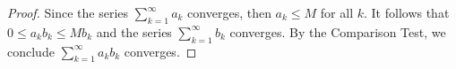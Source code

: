 \begin{Exercise}
\begin{proof}
Since the series $\sum_{k=1}^{\infty}a_k$ converges, then $a_k \leq M$ for all $k$. It follows that $0 \leq a_kb_k \leq Mb_k$ and the series  $\sum_{k=1}^{\infty}b_k$ converges. By the Comparison Test, we conclude $\sum_{k=1}^{\infty}a_kb_k$ converges.
\end{proof}
\end{Exercise}